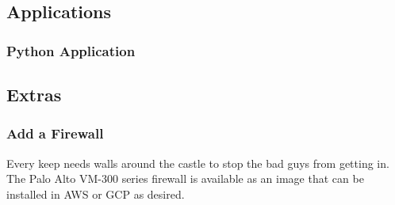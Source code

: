 \hypertarget{applications}{%
\subsection{Applications}\label{applications}}

\hypertarget{python-application}{%
\subsubsection{Python Application}\label{python-application}}

\hypertarget{extras}{%
\subsection{Extras}\label{extras}}

\hypertarget{add-a-firewall}{%
\subsubsection{Add a Firewall}\label{add-a-firewall}}

Every keep needs walls around the castle to stop the bad guys from
getting in. The Palo Alto VM-300 series firewall is available as an
image that can be installed in AWS or GCP as desired.
